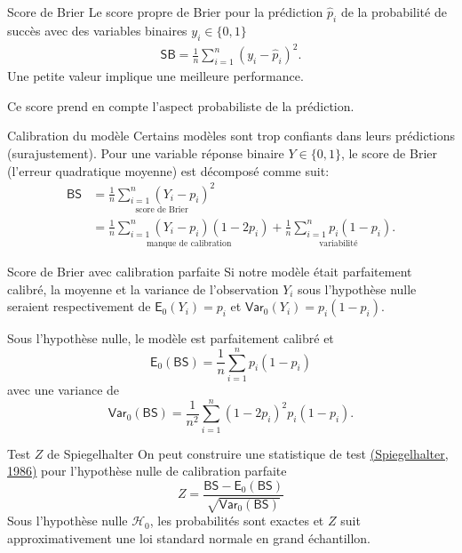 \documentclass[
  ignorenonframetext,
]{beamer}
\begin{document}
\begin{frame}{Score de Brier}
\label{score-de-brier}
Le score propre de Brier pour la prédiction \(\widehat{p}_i\) de la
probabilité de succès avec des variables binaires \(y_i \in \{0, 1\}\)
\begin{align*}
\mathsf{SB} = \frac{1}{n} \sum_{i=1}^n (y_i - \widehat{p}_i)^2.
\end{align*} Une petite valeur implique une meilleure performance.

Ce score prend en compte l'aspect probabiliste de la prédiction.
\end{frame}

\begin{frame}{Calibration du modèle}
\label{calibration-du-moduxe8le}
Certains modèles sont trop confiants dans leurs prédictions
(surajustement). Pour une variable réponse binaire \(Y \in \{0,1\}\), le
score de Brier (l'erreur quadratique moyenne) est décomposé comme suit:
\begin{align*}
\mathsf{BS} &= \underset{\text{score de Brier}}{\frac{1}{n} \sum_{i=1}^n (Y_i-p_i)^2}
\\&=\underset{\text{manque de calibration}}{\frac{1}{n} \sum_{i=1}^n(Y_i-p_i)(1-2p_i)} + \underset{\text{variabilité}}{\frac{1}{n} \sum_{i=1}^n p_i(1-p_i)}.
\end{align*}
\end{frame}

\begin{frame}{Score de Brier avec calibration parfaite}
\label{score-de-brier-avec-calibration-parfaite}
Si notre modèle était parfaitement calibré, la moyenne et la variance de
l'observation \(Y_i\) sous l'hypothèse nulle seraient respectivement de
\(\mathsf{E}_0(Y_i)=p_i\) et \(\mathsf{Var}_0(Y_i) = p_i(1-p_i)\).

Sous l'hypothèse nulle, le modèle est parfaitement calibré et
\[\mathsf{E}_0(\mathsf{BS}) = \frac{1}{n} \sum_{i=1}^n p_i(1-p_i)\] avec
une variance de \[
\mathsf{Var}_0(\mathsf{BS})=\frac{1}{n^2}\sum_{i=1}^n (1-2p_i)^2p_i(1-p_i).
\]
\end{frame}

\begin{frame}{Test \(Z\) de Spiegelhalter}
\label{test-z-de-spiegelhalter}
On peut construire une statistique de test
\href{https://doi.org/10.1002/sim.4780050506}{(Spiegelhalter, 1986)}
pour l'hypothèse nulle de calibration parfaite
\[Z = \frac{\mathsf{BS}-\mathsf{E}_0(\mathsf{BS})}{\sqrt{\mathsf{Var}_0(\mathsf{BS})}}\]
Sous l'hypothèse nulle \(\mathcal{H}_0\), les probabilités sont exactes
et \(Z\) suit approximativement une loi standard normale en grand
échantillon.
\end{frame}
\end{document}
